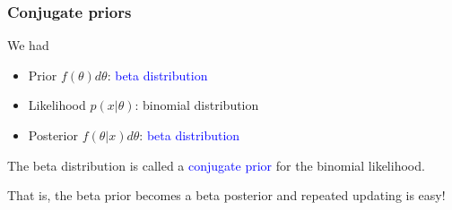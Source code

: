 \documentclass[12pt]{beamer}
\begin{document}
\begin{frame}
	\frametitle{Conjugate priors}
	
	We had
	\begin{itemize}[label={\color{blue}$\blacktriangleright$}]
		\item Prior $f(\theta) d\theta$: \textcolor{blue}{beta distribution}
		\item Likelihood $p(x|\theta)$: binomial distribution
		\item Posterior $f(\theta|x) d\theta$: \textcolor{blue}{beta distribution}
	\end{itemize}
	
	The beta distribution is called a \textcolor{blue}{conjugate prior} for the binomial likelihood.
	
	That is, the beta prior becomes a beta posterior and repeated updating is easy!
	
\end{frame}
\end{document}
